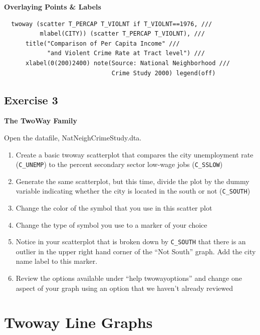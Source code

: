 \documentclass[]{book}
\providecommand{\tightlist}{%
  \setlength{\itemsep}{0pt}\setlength{\parskip}{0pt}}
\begin{document}
\textbf{Overlaying Points \& Labels}

\begin{verbatim}
  twoway (scatter T_PERCAP T_VIOLNT if T_VIOLNT==1976, ///
          mlabel(CITY)) (scatter T_PERCAP T_VIOLNT), ///
      title("Comparison of Per Capita Income" ///
            "and Violent Crime Rate at Tract level") ///
      xlabel(0(200)2400) note(Source: National Neighborhood ///
                              Crime Study 2000) legend(off)
\end{verbatim}

\hypertarget{exercise-3-5}{%
\subsection{Exercise 3}\label{exercise-3-5}}

\textbf{The TwoWay Family}

Open the datafile, NatNeighCrimeStudy.dta.

\begin{enumerate}
\def\labelenumi{\arabic{enumi}.}
\tightlist
\item
  Create a basic twoway scatterplot that compares the city unemployment rate (\texttt{C\_UNEMP}) to the percent secondary sector low-wage jobs (\texttt{C\_SSLOW})
\item
  Generate the same scatterplot, but this time, divide the plot by the dummy variable indicating whether the city is located in the south or not (\texttt{C\_SOUTH})
\item
  Change the color of the symbol that you use in this scatter plot
\item
  Change the type of symbol you use to a marker of your choice
\item
  Notice in your scatterplot that is broken down by \texttt{C\_SOUTH} that there is an outlier in the upper right hand corner of the ``Not South'' graph. Add the city name label to this marker.
\item
  Review the options available under ``help twowayoptions'' and change one aspect of your graph using an option that we haven't already reviewed
\end{enumerate}

\hypertarget{twoway-line-graphs}{%
\section{Twoway Line Graphs}\label{twoway-line-graphs}}
\end{document}
